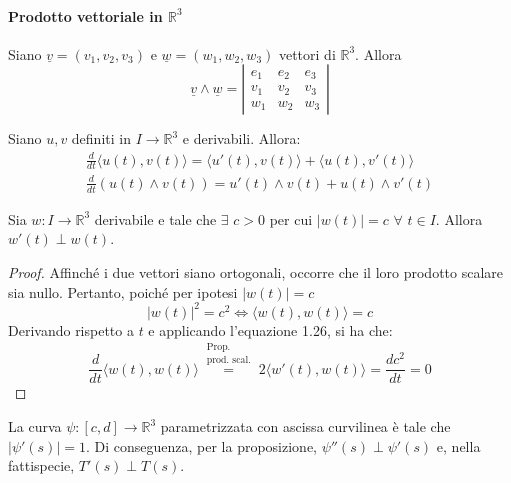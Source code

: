 \paragraph*{Prodotto vettoriale in $\mathbb{R}^3$}
Siano $\underline{v}=(v_1, v_2, v_3)$ e $\underline{w}=(w_1, w_2, w_3)$ vettori di $\mathbb{R}^3$. Allora
\begin{equation}
    \underline{v} \wedge \underline{w}=
    \left\lvert\begin{matrix}
         e_1 & e_2 & e_3 \\
               v_1 & v_2 & v_3 \\
               w_1 & w_2 & w_3
            \end{matrix}\right\rvert
\end{equation}
\begin{lemma}
    Siano $u, v$ definiti in $I\to\mathbb{R}^3$ e derivabili. Allora:
    \begin{align}
        \frac{d}{dt}{\langle u(t), v(t) \rangle} = \langle u'(t), v(t) \rangle + \langle u(t), v'(t) \rangle \\
        \frac{d}{dt}\left(u(t) \wedge v(t)\right) = u'(t) \wedge v(t) + u(t) \wedge v'(t)
    \end{align}
\end{lemma}
\begin{proposition}
    Sia $w:I\to\mathbb{R}^3$ derivabile e tale che $\exists$ $c>0$ per cui $|w(t)|=c$ $\forall$ $t \in I$. Allora $w'(t) \perp w(t)$.
\end{proposition}
    \begin{proof}
        Affinché i due vettori siano ortogonali, occorre che il loro prodotto scalare sia nullo. Pertanto, poiché per ipotesi $|w(t)|=c$
        \begin{equation}
            |w(t)|^2=c^2 \iff \langle w(t), w(t) \rangle = c
        \end{equation}
        Derivando rispetto a $t$ e applicando l'equazione 1.26, si ha che:
        \begin{equation}
            \frac{d}{dt}{\langle w(t), w(t)\rangle}\overset{\substack{\text{Prop.} \\ \text{prod. scal.} }}{=}2 \langle w'(t), w(t) \rangle = \frac{d c^2}{dt}=0
        \end{equation}
    \end{proof}
\begin{oss}
    La curva $\psi:[c,d] \to \mathbb{R}^3$ parametrizzata con ascissa curvilinea è tale che $|\psi'(s)|=1$. Di conseguenza, per la proposizione, $\psi''(s) \perp \psi'(s)$ e, nella fattispecie, $T'(s) \perp T (s)$.  
\end{oss}
